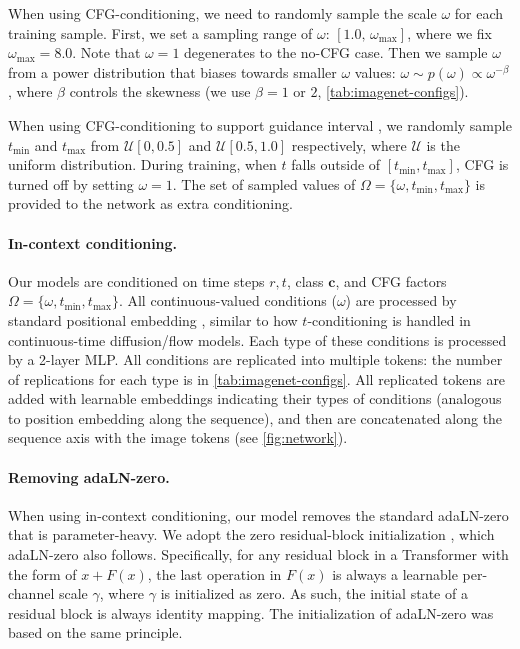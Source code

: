 


When using CFG-conditioning, we need to randomly sample the scale $\omega$ for each training sample.
First, we set a sampling range of $\omega$:  $[1.0,\, \omega_{\max}]$, where we fix $\omega_{\max}=8.0$.
Note that $\omega=1$ degenerates to the no-CFG case.
Then we sample $\omega$ from a power distribution that biases towards smaller $\omega$ values: $\omega \sim p(\omega)\propto\omega^{-\beta}$,
where $\beta$ controls the skewness (we use $\beta = 1$ or $2$, \cref{tab:imagenet-configs}).

When using CFG-conditioning to support guidance interval \cite{interval}, we randomly sample $t_{\min}$ and $t_{\max}$ from $\mathcal{U}[0,0.5]$ and $\mathcal{U}[0.5,1.0]$ respectively, where $\mathcal{U}$ is the uniform distribution. During training, when $t$ falls outside of $[t_{\min}, t_{\max}]$, CFG is turned off by setting $\omega=1$.
The set of sampled values of $\Omega=\{\omega, t_{\min}, t_{\max}\}$ is provided to the network as extra conditioning.

\paragraph{In-context conditioning.} Our models are conditioned on time steps $r, t$, class $\mathbf{c}$, and CFG factors $\Omega=\{\omega, t_{\min}, t_{\max}\}$. All continuous-valued conditions (\eg $\omega$) are processed by standard positional embedding \cite{transformer}, similar to how $t$-conditioning is handled in continuous-time diffusion/flow models.
Each type of these conditions is processed by a 2-layer MLP. All conditions are replicated into multiple tokens: the number of replications for each type is in \cref{tab:imagenet-configs}. All replicated tokens are added with learnable embeddings indicating their types of conditions (analogous to position embedding along the sequence), and then are concatenated along the sequence axis with the image tokens (see \cref{fig:network}).

\paragraph{Removing adaLN-zero.} When using in-context conditioning, our model removes the standard adaLN-zero \cite{dit} that is parameter-heavy.
We adopt the zero residual-block initialization \cite{largesgd}, which adaLN-zero \cite{dit} also follows. Specifically, for any residual block \cite{resnet} in a Transformer \cite{transformer} with the form of $x+F(x)$, the last operation in $F(x)$ is always a learnable per-channel scale $\gamma$, where $\gamma$ is initialized as zero. As such, the initial state of a residual block is always identity mapping. The initialization of adaLN-zero \cite{dit} was based on the same principle.

